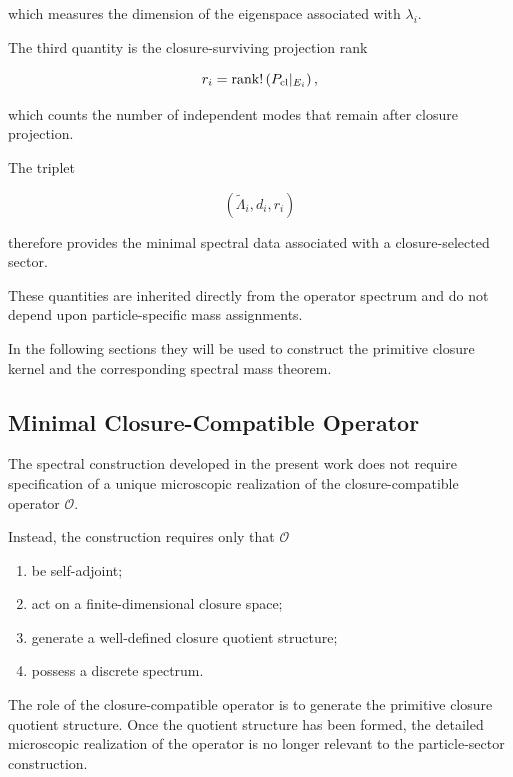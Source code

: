 \documentclass[11pt]{article}
\theoremstyle{definition}
\theoremstyle{remark}
\begin{document}
which measures the dimension of the eigenspace associated with
\(\lambda_i\).

The third quantity is the closure-surviving projection rank

\begin{equation}
r_i =
\operatorname{rank}
!\left(
P_{\rm cl}|_{E_i}
\right),
\label{eq:ri}
\end{equation}

which counts the number of independent modes that remain after
closure projection.

The triplet

\begin{equation}
\left(
\widetilde{\Lambda}_i,
d_i,
r_i
\right)
\label{eq:spectral_triplet}
\end{equation}

therefore provides the minimal spectral data associated with a
closure-selected sector.

These quantities are inherited directly from the operator
spectrum and do not depend upon particle-specific mass
assignments.

In the following sections they will be used to construct the
primitive closure kernel and the corresponding spectral mass
theorem.


\subsection{Minimal Closure-Compatible Operator}
\label{subsec:minimal_closure_operator}

The spectral construction developed in the present work does not
require specification of a unique microscopic realization of the
closure-compatible operator \(\mathcal O\).

Instead, the construction requires only that \(\mathcal O\)

\begin{enumerate}
\item be self-adjoint;
\item act on a finite-dimensional closure space;
\item generate a well-defined closure quotient structure;
\item possess a discrete spectrum.
\end{enumerate}

The role of the closure-compatible operator is to generate the
primitive closure quotient structure. Once the quotient
structure has been formed, the detailed microscopic realization
of the operator is no longer relevant to the particle-sector
construction.
\end{document}
